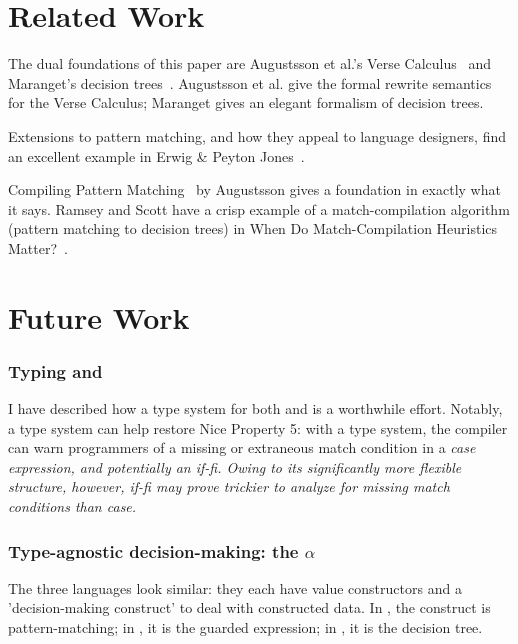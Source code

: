 \documentclass[manuscript,screen,review, 12pt, nonacm]{acmart}
\begin{document}
    \section{Related Work}

    The dual foundations of this paper are Augustsson et al.'s Verse
    Calculus~\citep{verse} and Maranget's decision trees~\citep{maranget}.
    Augustsson et al. give the formal rewrite semantics for the Verse Calculus;
    Maranget gives an elegant formalism of decision trees. 
    
    Extensions to pattern matching, and how they appeal to language designers,
    find an excellent example in Erwig \& Peyton Jones~\citep{guardproposal}.
    
    Compiling Pattern Matching~\citep{augustsson1985compiling} by Augustsson
    gives a foundation in exactly what it says. Ramsey and Scott have a crisp
    example of a match-compilation algorithm (pattern matching to decision
    trees) in When Do Match-Compilation Heuristics Matter?~\citep{scottramsey}. 
    
    \section{Future Work}        
    \label{futurework}
        \subsubsection{Typing \PPlus and \VMinus}
        \label{typingppandvm}

        I have described how a type system for both \PPlus and \VMinus is a
        worthwhile effort. Notably, a type system can help restore Nice Property
        5: with a type system, the compiler can warn programmers of a missing or
        extraneous match condition in a \it{case} expression, and potentially an
        \it{if-fi}. Owing to its significantly more flexible structure, however,
        \it{if-fi} may prove trickier to analyze for missing match conditions
        than \it{case}.

        \subsubsection{Type-agnostic decision-making: the $\alpha$}
        \label{alphas}

        The three languages look similar: they each have value constructors and
        a 'decision-making construct' to deal with constructed data. In \PPlus, the
        construct is pattern-matching; in \VMinus, it is the guarded expression; in \D,
        it is the decision tree. 
\end{document}
